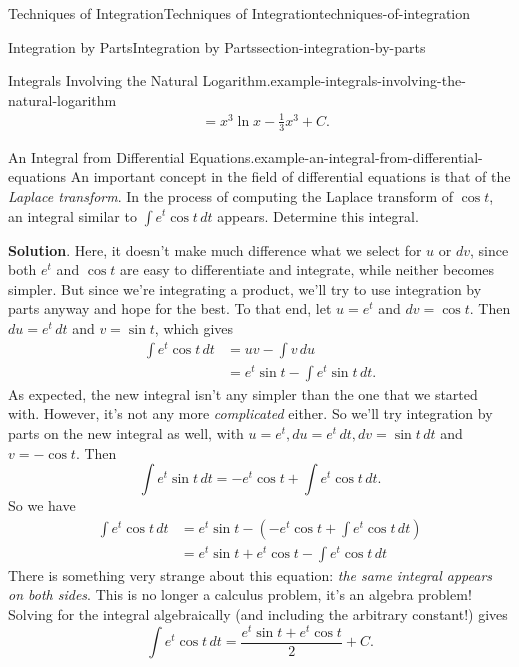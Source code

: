 \documentclass[oneside,10pt,]{book}
\numberwithin{equation}{section}
\begin{document}
\begin{chapterptx}{Techniques of Integration}{}{Techniques of Integration}{}{}{techniques-of-integration}
\begin{sectionptx}{Integration by Parts}{}{Integration by Parts}{}{}{section-integration-by-parts}
\begin{example}{Integrals Involving the Natural Logarithm.}{example-integrals-involving-the-natural-logarithm}
\begin{align*}
& = x^{3}\ln x - \frac{1}{3}x^{3} + C. 
\end{align*}
\end{example}
\begin{example}{An Integral from Differential Equations.}{example-an-integral-from-differential-equations}%
\hypertarget{p-509}{}%
An important concept in the field of differential equations is that of the \emph{Laplace transform}. In the process of computing the Laplace transform of \(\cos t\), an integral similar to \(\int e^{t}\cos t\,dt\) appears. Determine this integral.%
\par\smallskip%
\noindent\textbf{Solution}.\hypertarget{solution-112}{}\quad%
\hypertarget{p-510}{}%
Here, it doesn't make much difference what we select for \(u\) or \(dv\), since both \(e^{t}\) and \(\cos t\) are easy to differentiate and integrate, while neither becomes simpler. But since we're integrating a product, we'll try to use integration by parts anyway and hope for the best. To that end, let \(u = e^{t}\) and \(dv = \cos t\). Then \(du = e^{t}\,dt\) and \(v = \sin t\), which gives%
%
\begin{align*}
\int e^{t}\cos t\,dt & = uv - \int v\,du \\
& = e^{t}\sin t - \int e^{t}\sin t\,dt. 
\end{align*}
\hypertarget{p-511}{}%
As expected, the new integral isn't any simpler than the one that we started with. However, it's not any more \emph{complicated} either. So we'll try integration by parts on the new integral as well, with \(u = e^{t}, du = e^{t}\,dt, dv = \sin t\,dt\) and \(v = -\cos t\). Then%
%
\begin{equation*}
\int e^{t}\sin t\,dt = -e^{t}\cos t + \int e^{t}\cos t\,dt.
\end{equation*}
\hypertarget{p-512}{}%
So we have%
%
\begin{align*}
\int e^{t}\cos t\,dt & = e^{t}\sin t - (-e^{t}\cos t + \int e^{t}\cos t\,dt) \\
& = e^{t}\sin t + e^{t}\cos t - \int e^{t}\cos t\,dt 
\end{align*}
\hypertarget{p-513}{}%
There is something very strange about this equation: \emph{the same integral appears on both sides}. This is no longer a calculus problem, it's an algebra problem! Solving for the integral algebraically (and including the arbitrary constant!) gives%
\begin{equation*}
\int e^{t}\cos t\,dt = \frac{e^{t}\sin t + e^{t}\cos t}{2} + C.
\end{equation*}
%
\end{example}

\end{sectionptx}
\end{chapterptx}
\end{document}
